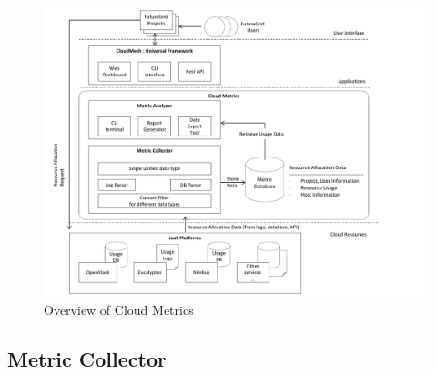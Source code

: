 \documentclass{sig-alternate-05-2015}
\begin{document}
\begin{figure}[h!] 
  \centering 
    \includegraphics[width=1.0\columnwidth]{images/system_overview.pdf} 
  \caption{Overview of Cloud Metrics}\label{F:fig7} 
\end{figure} 


\subsection{Metric Collector}
\end{document}
